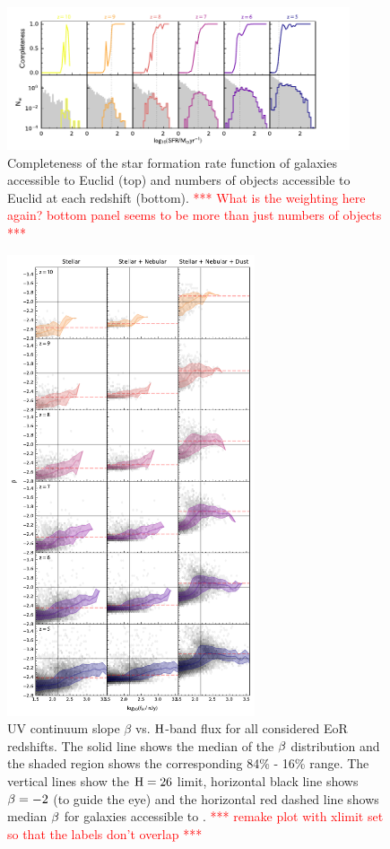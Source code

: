 \begin{figure}
	\centering
	\includegraphics[width=0.9\textwidth]{figures/physical/hist_SFR_inst_30.pdf}
	\caption{Completeness of the star formation rate function of galaxies accessible to Euclid (top) and numbers of objects accessible to Euclid at each redshift (bottom). \textcolor{red}{*** What is the weighting here again? bottom panel seems to be more than just numbers of objects ***}}
	\label{fig:physical:sfr}
\end{figure}

\begin{figure}
	\centering
	\includegraphics[width=0.65\textwidth]{./figures/beta/beta_all}
	\caption{UV continuum slope $\beta$ vs. $\rm H$-band flux for all considered EoR redshifts. The solid line shows the median of the $\rm \beta$ distribution and the shaded region shows the corresponding 84\% - 16\% range. The vertical lines show the $\rm H = 26$ limit, horizontal black line shows $\rm \beta = -2$ (to guide the eye) and the horizontal red dashed line shows median $\rm \beta$ for galaxies accessible to \euclid. \label{fig:beta_all} \textcolor{red}{*** remake plot with xlimit set so that the labels don't overlap ***}}
\end{figure}